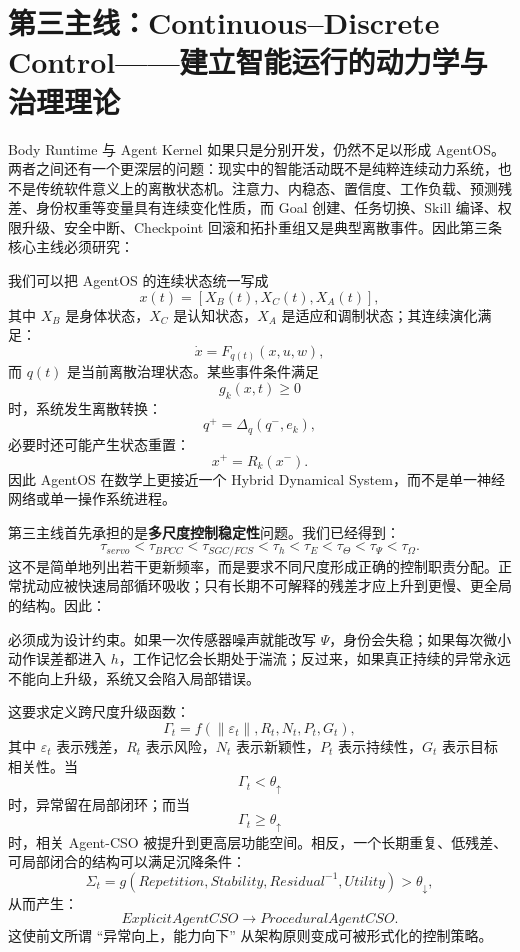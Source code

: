 \section{第三主线：Continuous--Discrete Control——建立智能运行的动力学与治理理论}
\label{sec:roadmap-continuous-discrete-control}

Body Runtime 与 Agent Kernel 如果只是分别开发，仍然不足以形成 AgentOS。两者之间还有一个更深层的问题：现实中的智能活动既不是纯粹连续动力系统，也不是传统软件意义上的离散状态机。注意力、内稳态、置信度、工作负载、预测残差、身份权重等变量具有连续变化性质，而 Goal 创建、任务切换、Skill 编译、权限升级、安全中断、Checkpoint 回滚和拓扑重组又是典型离散事件。因此第三条核心主线必须研究：
\begin{statementbox}
\centering
{}
\end{statementbox}

我们可以把 AgentOS 的连续状态统一写成
\[
x(t)
=
\left[
X_B(t),
X_C(t),
X_A(t)
\right],
\]
其中 $X_B$ 是身体状态，$X_C$ 是认知状态，$X_A$ 是适应和调制状态；其连续演化满足：
\[
\dot x
=
F_{q(t)}
\left(
x,u,w
\right),
\]
而 $q(t)$ 是当前离散治理状态。某些事件条件满足
\[
g_k(x,t)\geq 0
\]
时，系统发生离散转换：
\[
q^+
=
\Delta_q(q^-,e_k),
\]
必要时还可能产生状态重置：
\[
x^+
=
R_k(x^-).
\]
因此 AgentOS 在数学上更接近一个 Hybrid Dynamical System，而不是单一神经网络或单一操作系统进程。

第三主线首先承担的是\textbf{多尺度控制稳定性}问题。我们已经得到：
\[
\tau_{servo}
<
\tau_{BPCC}
<
\tau_{SGC/FCS}
<
\tau_h
<
\tau_E
<
\tau_\Theta
<
\tau_\Psi
<
\tau_\Omega .
\]
这不是简单地列出若干更新频率，而是要求不同尺度形成正确的控制职责分配。正常扰动应被快速局部循环吸收；只有长期不可解释的残差才应上升到更慢、更全局的结构。因此：
\begin{statementbox}
\centering
{}
\end{statementbox}
必须成为设计约束。如果一次传感器噪声就能改写 $\Psi$，身份会失稳；如果每次微小动作误差都进入 $h$，工作记忆会长期处于湍流；反过来，如果真正持续的异常永远不能向上升级，系统又会陷入局部错误。

这要求定义跨尺度升级函数：
\[
\Gamma_t
=
f
\left(
\|\varepsilon_t\|,
R_t,
N_t,
P_t,
G_t
\right),
\]
其中 $\varepsilon_t$ 表示残差，$R_t$ 表示风险，$N_t$ 表示新颖性，$P_t$ 表示持续性，$G_t$ 表示目标相关性。当
\[
\Gamma_t<\theta_{\uparrow}
\]
时，异常留在局部闭环；而当
\[
\Gamma_t\geq\theta_{\uparrow}
\]
时，相关 Agent-CSO 被提升到更高层功能空间。相反，一个长期重复、低残差、可局部闭合的结构可以满足沉降条件：
\[
\Sigma_t
=
g
\left(
Repetition,
Stability,
Residual^{-1},
Utility
\right)
>
\theta_{\downarrow},
\]
从而产生：
\[
ExplicitAgentCSO
\rightarrow
ProceduralAgentCSO.
\]
这使前文所谓 ``异常向上，能力向下'' 从架构原则变成可被形式化的控制策略。

